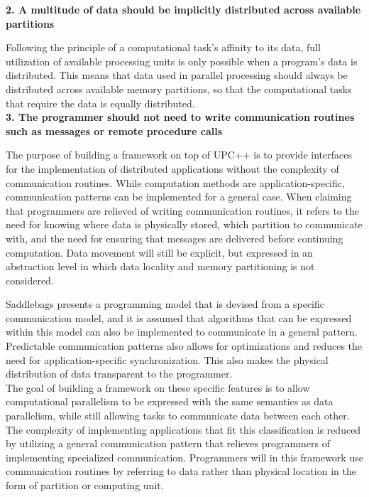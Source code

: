 \documentclass{uit-report}
\begin{document}
\hspace{4ex} \textbf{2. A multitude of data should be implicitly distributed across available partitions}

Following the principle of a computational task's affinity to its data, full utilization of available processing units is only possible when a program's data is distributed. This means that data used in parallel processing should always be distributed across available memory partitions, so that the computational tasks that require the data is equally distributed.
\\	

\hspace{4ex} \textbf{3. The programmer should not need to write communication routines such as messages or remote procedure calls}

The purpose of building a framework on top of UPC++ is to provide interfaces for the implementation of distributed applications without the complexity of communication routines. While computation methods are application-specific, communication patterns can be implemented for a general case. When claiming that programmers are relieved of writing communication routines, it refers to the need for knowing where data is physically stored, which partition to communicate with, and the need for ensuring that messages are delivered before continuing computation. Data movement will still be explicit, but expressed in an abstraction level in which data locality and memory partitioning is not considered.

Saddlebags presents a programming model that is devised from a specific communication model, and it is assumed that algorithms that can be expressed within this model can also be implemented to communicate in a general pattern. Predictable communication patterns also allows for optimizations and reduces the need for application-specific synchronization. This also makes the physical distribution of data transparent to the programmer.
\\

The goal of building a framework on these specific features is to allow computational parallelism to be expressed with the same semantics as data parallelism, while still allowing tasks to communicate data between each other. The complexity of implementing applications that fit this classification is reduced by utilizing a general communication pattern that relieves programmers of implementing specialized communication. Programmers will in this framework use communication routines by referring to data rather than physical location in the form of partition or computing unit.
\end{document}
